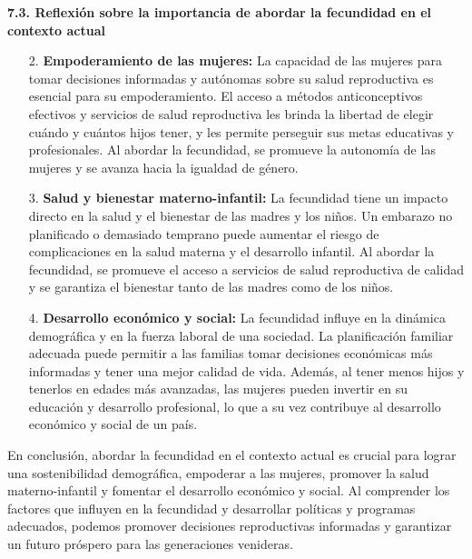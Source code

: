 \documentclass[8pt,a4paper]{beamer}
\begin{document}
{\begin{frame}{}
\begin{block}{\textbf{7.3. Reflexión sobre la importancia de abordar la fecundidad en el contexto actual}}
\begin{enumerate}
\item[2.] \textbf{Empoderamiento de las mujeres:} La capacidad de las mujeres para tomar decisiones informadas y autónomas sobre su salud reproductiva es esencial para su empoderamiento. El acceso a métodos anticonceptivos efectivos y servicios de salud reproductiva les brinda la libertad de elegir cuándo y cuántos hijos tener, y les permite perseguir sus metas educativas y profesionales. Al abordar la fecundidad, se promueve la autonomía de las mujeres y se avanza hacia la igualdad de género.
\end{enumerate}
\end{block}
\end{frame}

\begin{frame}{}
\begin{block}{}
\setlength{\parskip}{3px}
\justifying

\begin{enumerate}
\setlength{\parskip}{3px}
\justifying
\item[3.] \textbf{Salud y bienestar materno-infantil:} La fecundidad tiene un impacto directo en la salud y el bienestar de las madres y los niños. Un embarazo no planificado o demasiado temprano puede aumentar el riesgo de complicaciones en la salud materna y el desarrollo infantil. Al abordar la fecundidad, se promueve el acceso a servicios de salud reproductiva de calidad y se garantiza el bienestar tanto de las madres como de los niños.

\item[4.] \textbf{Desarrollo económico y social:} La fecundidad influye en la dinámica demográfica y en la fuerza laboral de una sociedad. La planificación familiar adecuada puede permitir a las familias tomar decisiones económicas más informadas y tener una mejor calidad de vida. Además, al tener menos hijos y tenerlos en edades más avanzadas, las mujeres pueden invertir en su educación y desarrollo profesional, lo que a su vez contribuye al desarrollo económico y social de un país.
\end{enumerate}
En conclusión, abordar la fecundidad en el contexto actual es crucial para lograr una sostenibilidad demográfica, empoderar a las mujeres, promover la salud materno-infantil y fomentar el desarrollo económico y social. Al comprender los factores que influyen en la fecundidad y desarrollar políticas y programas adecuados, podemos promover decisiones reproductivas informadas y garantizar un futuro próspero para las generaciones venideras.
\end{block}
\end{frame}

}
\end{document}
